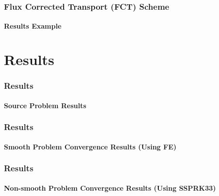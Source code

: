 \documentclass{beamer}
\begin{document}
\begin{frame}
\frametitle{Flux Corrected Transport (FCT) Scheme}
\framesubtitle{Results Example}


\end{frame}
\section{Results}
\begin{frame}
\frametitle{Results}
\framesubtitle{Source Problem Results}


\end{frame}
\begin{frame}
\frametitle{Results}
\framesubtitle{Smooth Problem Convergence Results (Using FE)}


\end{frame}
\begin{frame}
\frametitle{Results}
\framesubtitle{Non-smooth Problem Convergence Results (Using SSPRK33)}


\end{frame}
\end{document}
